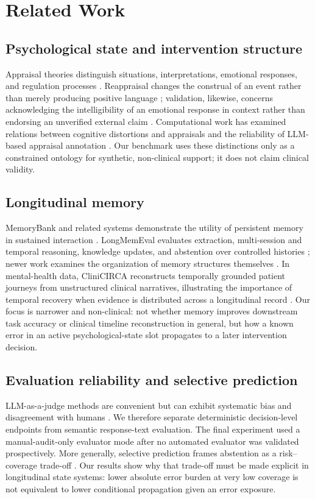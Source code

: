 \documentclass[10pt]{article}
\begin{document}
\section{Related Work}
\subsection{Psychological state and intervention structure}
Appraisal theories distinguish situations, interpretations, emotional responses, and regulation processes \cite{gross1998emotion}. Reappraisal changes the construal of an event rather than merely producing positive language \cite{uusberg2023expanded}; validation, likewise, concerns acknowledging the intelligibility of an emotional response in context rather than endorsing an unverified external claim \cite{kuo2022validation}. Computational work has examined relations between cognitive distortions and appraisals \cite{agarwal2025appraisals} and the reliability of LLM-based appraisal annotation \cite{ruder2025appraisal}. Our benchmark uses these distinctions only as a constrained ontology for synthetic, non-clinical support; it does not claim clinical validity.

\subsection{Longitudinal memory}
MemoryBank and related systems demonstrate the utility of persistent memory in sustained interaction \cite{zhong2024memorybank}. LongMemEval evaluates extraction, multi-session and temporal reasoning, knowledge updates, and abstention over controlled histories \cite{wu2024longmemeval}; newer work examines the organization of memory structures themselves \cite{shutova2026structmemeval}. In mental-health data, CliniCIRCA reconstructs temporally grounded patient journeys from unstructured clinical narratives, illustrating the importance of temporal recovery when evidence is distributed across a longitudinal record \cite{zhang2026clinicirca}. Our focus is narrower and non-clinical: not whether memory improves downstream task accuracy or clinical timeline reconstruction in general, but how a known error in an active psychological-state slot propagates to a later intervention decision.

\subsection{Evaluation reliability and selective prediction}
LLM-as-a-judge methods are convenient but can exhibit systematic bias and disagreement with humans \cite{zheng2023judge,chen2024judges}. We therefore separate deterministic decision-level endpoints from semantic response-text evaluation. The final experiment used a manual-audit-only evaluator mode after no automated evaluator was validated prospectively. More generally, selective prediction frames abstention as a risk--coverage trade-off \cite{geifman2019selectivenet}. Our results show why that trade-off must be made explicit in longitudinal state systems: lower absolute error burden at very low coverage is not equivalent to lower conditional propagation given an error exposure.
\end{document}

